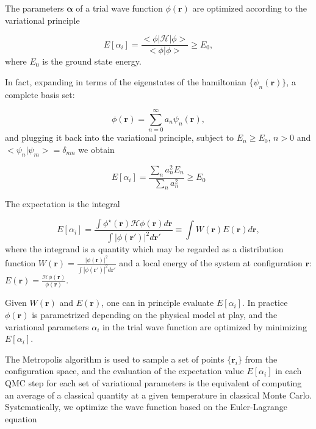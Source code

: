 The parameters $\bm \alpha$ of a trial wave function $\phi(\bm r)$ are optimized according to the variational principle

\begin{equation}
E[\alpha_i] = \frac{< \phi | \mathcal{H} | \phi >}{<\phi | \phi>} \ge E_0,
\end{equation}
where $E_0$ is the ground state energy.

In fact, expanding in terms of the eigenstates of the hamiltonian $\{ \psi_n (\bm r) \}$, a complete basis set:

\begin{equation}
\phi (\bm r) = \sum_{n= 0}^{\infty} a_n \psi_n (\bm r) ,
\end{equation}
and plugging it back into the variational principle, subject to $E_n \ge E_0 ,\, n > 0$ and $<\psi_n | \psi_m> = \delta_{nm}$ we obtain

\begin{equation}
E[\alpha_i] = \frac{\sum_n a_n^2 E_n}{\sum_n a_n^2 } \ge E_0
\end{equation}

The expectation is the integral

\begin{equation}
E[\alpha_i] = \frac{\int \phi^\star (\bm r) \mathcal{H} \phi (\bm r) d\bm r}{\int | \phi (\bm r') |^2 d\bm r'} \equiv \int W(\bm r) E(\bm r) d\bm r ,
\end{equation}
where the integrand is a quantity which may be regarded as a distribution function $W(\bm r) = \frac{|\phi (\bm r)|^2}{\int |\phi(\bm r')|^2 d\bm r'}$ and a local energy of the system at configuration $\bm r$: $E(\bm r) = \frac{\mathcal{H}\phi(\bm r)}{\phi (\bm r)}$.

Given $W(\bm r)$ and $E(\bm r)$, one can in principle evaluate $E[\alpha_i]$. In practice $\phi (\bm r) $ is parametrized depending on the physical model at play, and the variational parameters $\alpha_i$ in the trial wave function are optimized by minimizing $E[\alpha_i]$.\par

The Metropolis algorithm is used to sample a set of points $\{\bm r_i\}$ from the configuration space, and the evaluation of the expectation value $E[\alpha_i]$ in each QMC step for each set of variational parameters is the equivalent of computing an average of a classical quantity at a given temperature in classical Monte Carlo. Systematically, we optimize the wave function based on the Euler-Lagrange equation

